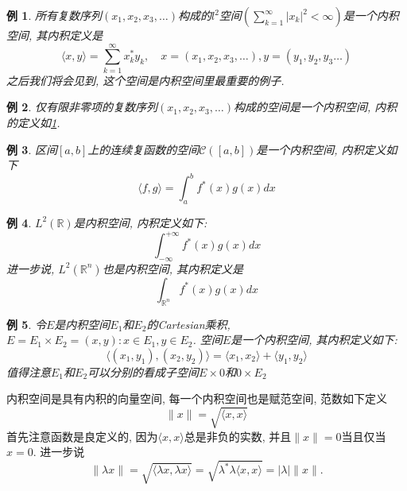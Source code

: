 \documentclass[a4paper,11pt]{article}
\newtheorem{example}{例}[section]
\begin{document}
\begin{example}\label{l^2 inner space}
  所有复数序列$(x_1,x_2,x_3,\dots)$构成的$l^2$空间$(\sum_{k=1}^{\infty}|x_k|^2<\infty)$是一个内积空间, 其内积定义是
  \begin{equation*}
    \langle x,y\rangle=\sum_{k=1}^{\infty}x_k^*y_k,\quad x=(x_1,x_2,x_3,\dots),y=(y_1,y_2,y_3\dots)
  \end{equation*}
  之后我们将会见到, 这个空间是内积空间里最重要的例子.
\end{example}
\begin{example}\label{nonzero term}
  仅有限非零项的复数序列$(x_1,x_2,x_3,\dots)$构成的空间是一个内积空间, 内积的定义如\ref{l^2 inner space}.
\end{example}
\begin{example}\label{C[a,b]inner}
  区间$[a,b]$上的连续复函数的空间$\mathcal{C}([a,b])$是一个内积空间, 内积定义如下
  \begin{equation*}
    \langle f,g\rangle=\int_{a}^{b}f^*(x)g(x)dx
  \end{equation*}
\end{example}
\begin{example}
  $L^2(\mathbb{R})$是内积空间, 内积定义如下:
  \begin{equation*}
    \int_{-\infty}^{+\infty}f^*(x)g(x)dx
  \end{equation*}
  进一步说, $L^2(\mathbb{R}^n)$也是内积空间, 其内积定义是
  \begin{equation*}
    \int_{\mathbb{R}^n}f^*(x)g(x)dx
  \end{equation*}
\end{example}
\begin{example}
  令$E$是内积空间$E_1$和$E_2$的Cartesian乘积, $E=E_1\times E_2={(x,y):x\in E_1,y\in E_2}$. 空间$E$是一个内积空间, 其内积定义如下:
  \begin{equation*}
    \langle(x_1,y_1),(x_2,y_2)\rangle=\langle x_1,x_2\rangle+\langle y_1,y_2\rangle
  \end{equation*}
  值得注意$E_1$和$E_2$可以分别的看成子空间$E\times{0}$和${0}\times E_2$
\end{example}
内积空间是具有内积的向量空间, 每一个内积空间也是赋范空间, 范数如下定义
\begin{equation*}
  \|x\|=\sqrt{\langle x,x\rangle}
\end{equation*}
首先注意函数是良定义的, 因为$\langle x,x\rangle$总是非负的实数, 并且$\|x\|=0$当且仅当$x=0$. 进一步说
\begin{equation*}
  \|\lambda x\|=\sqrt{\langle\lambda x,\lambda x\rangle}=\sqrt{\lambda^*\lambda\langle x,x\rangle}=|\lambda|\|x\|.
\end{equation*}
\end{document}
